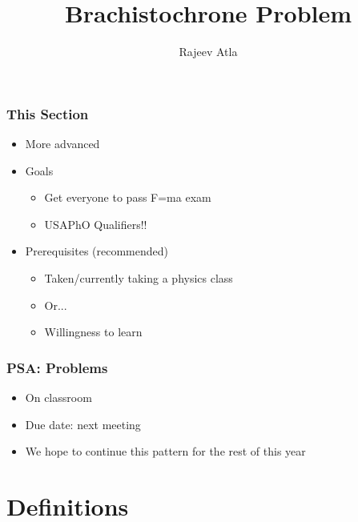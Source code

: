 \documentclass[12pt]{beamer}
\title{Brachistochrone Problem}
\author{Rajeev Atla}
\institute{Physics Club}
\begin{document}
\frame{\titlepage}

\begin{frame}
\frametitle{This Section}
\begin{itemize}
    \pause
    \item More advanced
    \pause
    \item Goals
    \begin{itemize}
        \pause
        \item Get everyone to pass F=ma exam
        \pause
        \item USAPhO Qualifiers!!
    \end{itemize}
    \pause
    \item Prerequisites (recommended)
    \begin{itemize}
        \pause
        \item Taken/currently taking a physics class
        \pause
        \item Or...
        \pause
        \item Willingness to learn
    \end{itemize}
\end{itemize}

\end{frame}

\begin{frame}
\frametitle{PSA: Problems}
\begin{itemize}
    \item On classroom
    \pause
    \item Due date: next meeting
    \pause
    \item We hope to continue this pattern for the rest of this year
\end{itemize}
\end{frame}

\section{Definitions}
\end{document}
